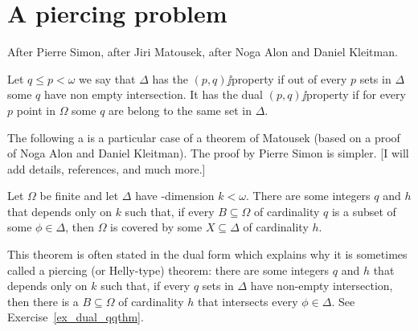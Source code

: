 \documentclass[creche.tex]{subfiles}
\begin{document}
\section{A piercing problem}\label{qq}

After Pierre Simon, after Jiri Matousek, after Noga Alon and Daniel Kleitman.

Let $q\le p<\omega$ we say that $\Delta$ has the $(p,q)\jj$property if out of every $p$ sets in $\Delta$ some $q$ have non empty intersection. It has the dual $(p,q)\jj$property if for every $p$ point in $\Omega$ some $q$ are belong to the same set in $\Delta$. 

The following a is a particular case of a theorem of  Matousek (based on a proof of Noga Alon and Daniel Kleitman). The proof by Pierre Simon is simpler. [I will add details, references, and much more.]

\begin{theorem}\label{thm_qq}
Let $\Omega$ be finite and let $\Delta$ have \vc-dimension $k<\omega$. There are some integers $q$ and $h$ that depends only on $k$ such that, if every $B\subseteq\Omega$ of cardinality $q$ is a subset of some $\phi\in\Delta$, then $\Omega$ is covered by some $X\subseteq\Delta$ of cardinality $h$.
\end{theorem}

This theorem is often stated in the dual form which explains why it is sometimes called a piercing (or Helly-type) theorem: there are some integers $q$ and $h$ that depends only on $k$ such that, if every $q$ sets in $\Delta$ have non-empty intersection, then there is a $B\subseteq\Omega$ of cardinality $h$ that intersects every $\phi\in\Delta$. See Exercise~\ref{ex_dual_qqthm}.
\end{document}
